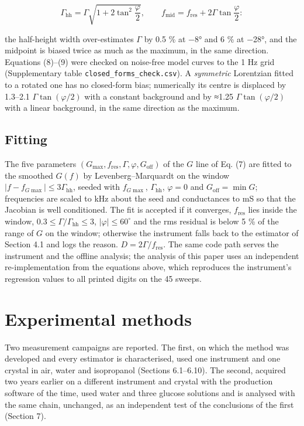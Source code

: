 \documentclass[11pt,a4paper]{article}
\begin{document}
\[\Gamma_\mathrm{hh} = \Gamma\sqrt{1 + 2\tan^2\frac{\varphi}{2}},\qquad f_\mathrm{mid} = f_\mathrm{res} + 2\Gamma\tan\frac{\varphi}{2}: \tag{9}\]

the half-height width over-estimates \(\Gamma\) by 0.5 \% at −8° and 6
\% at −28°, and the midpoint is biased twice as much as the maximum, in
the same direction. Equations (8)--(9) were checked on noise-free model
curves to the 1 Hz grid (Supplementary table
\texttt{closed\_forms\_check.csv}). A \emph{symmetric} Lorentzian fitted
to a rotated one has no closed-form bias; numerically its centre is
displaced by 1.3--2.1 \(\Gamma\tan(\varphi/2)\) with a constant
background and by ≈1.25 \(\Gamma\tan(\varphi/2)\) with a linear
background, in the same direction as the maximum.

\hypertarget{fitting}{%
\subsection{Fitting}\label{fitting}}

The five parameters
\((G_\mathrm{max}, f_\mathrm{res}, \Gamma, \varphi, G_\mathrm{off})\) of
the \(G\) line of Eq. (7) are fitted to the smoothed \(G(f)\) by
Levenberg--Marquardt on the window
\(|f - f_{G\max}| \le 3\Gamma_\mathrm{hh}\), seeded with \(f_{G\max}\),
\(\Gamma_\mathrm{hh}\), \(\varphi = 0\) and \(G_\mathrm{off} = \min G\);
frequencies are scaled to kHz about the seed and conductances to mS so
that the Jacobian is well conditioned. The fit is accepted if it
converges, \(f_\mathrm{res}\) lies inside the window,
\(0.3 \le \Gamma/\Gamma_\mathrm{hh} \le 3\), \(|\varphi| \le 60^\circ\)
and the rms residual is below 5 \% of the range of \(G\) on the window;
otherwise the instrument falls back to the estimator of Section 4.1 and
logs the reason. \(D = 2\Gamma/f_\mathrm{res}\). The same code path
serves the instrument and the offline analysis; the analysis of this
paper uses an independent re-implementation from the equations above,
which reproduces the instrument's regression values to all printed
digits on the 45 sweeps.

\hypertarget{experimental-methods}{%
\section{Experimental methods}\label{experimental-methods}}

Two measurement campaigns are reported. The first, on which the method
was developed and every estimator is characterised, used one instrument
and one crystal in air, water and isopropanol (Sections 6.1--6.10). The
second, acquired two years earlier on a different instrument and crystal
with the production software of the time, used water and three glucose
solutions and is analysed with the same chain, unchanged, as an
independent test of the conclusions of the first (Section 7).
\end{document}

